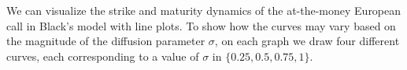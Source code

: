 \documentclass{article}
\numberwithin{equation}{section}
\begin{document}
\medskip

We can visualize the strike and maturity dynamics of the at-the-money European
call in Black's model with line plots\footnotemark{}. To show how the curves may vary based on the magnitude of the diffusion
parameter $ \sigma $, on each graph we draw four different curves, each
corresponding to a value of $ \sigma $ in $ \{0.25, 0.5, 0.75, 1\} $.

\end{document}

